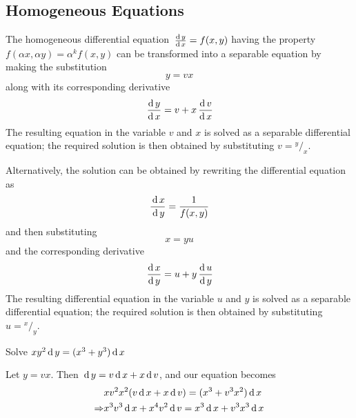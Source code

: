 \documentclass[12pt,oneside,a4paper]{article}
\begin{document}
\subsection{Homogeneous Equations}
The homogeneous differential equation $ \,\frac{\mathrm{d}\,y}{\mathrm{d}\,x}=f(x,y) $ having the property $f(\alpha x,\alpha y)=\alpha^k f(x,y)$ can be transformed into a separable equation by making the substitution\[y=vx\]along with its corresponding derivative\[\,\frac{\mathrm{d}\,y}{\mathrm{d}\,x}=v+x\,\frac{\mathrm{d}\,v}{\mathrm{d}\,x}\]
The resulting equation in the variable $ v $ and $ x $ is solved as a separable differential equation; the required solution is then obtained by substituting $ v={}^y/_x $.

Alternatively, the solution can be obtained by rewriting the differential equation as \[\frac{\,\mathrm{d}\, x}{\,\mathrm{d}\, y}=\frac{1}{f(x,y)}\]and then substituting \[x=yu\] and the corresponding derivative \[\,\frac{\mathrm{d}\,x}{\mathrm{d}\,y}=u+y\,\frac{\mathrm{d}\,u}{\mathrm{d}\,y}\] The resulting differential equation in the variable $ u $ and $ y $ is solved as a separable differential equation; the required solution is then obtained by substituting $ u={}^x/_y $.
\begin{prob}
    Solve $ xy^2\,\mathrm{d}\, y=(x^3+y^3)\,\mathrm{d}\, x $
\end{prob}
\begin{soln}
    Let $ y=vx $. Then $ \,\mathrm{d}\, y =v\,\mathrm{d}\, x +x\,\mathrm{d}\, v $, and our equation becomes 
    \begin{align*}
        & xv^2x^2(v\,\mathrm{d}\, x +x\,\mathrm{d}\, v)=(x^3+v^3x^2)\,\mathrm{d}\, x\\
        \Rightarrow & x^3v^3\,\mathrm{d}\, x+x^4v^2\,\mathrm{d}\, v= x^3\,\mathrm{d}\, x+v^3x^3\,\mathrm{d}\, x
    \end{align*}
\end{soln}
\newpage
\printindex
\end{document}
